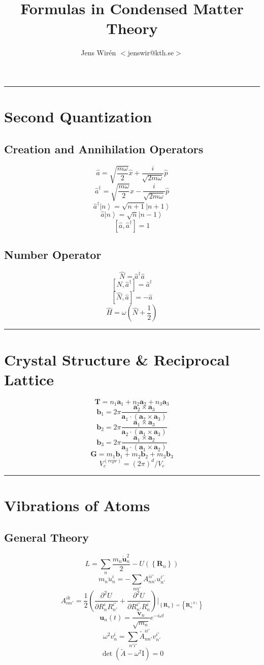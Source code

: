 \documentclass[12pt]{extarticle}
\title{Formulas in Condensed Matter Theory}
\author{Jens Wir\'{e}n $<$jenswir@kth.se$>$}
\newcommand{\parentheses}[1]{\ensuremath{\left( #1 \right)}}
\newcommand{\commutator}[1]{\ensuremath{\left[ #1 \right]}}
\newcommand{\anticommutator}[1]{\ensuremath{\left\lbrace #1 \right\rbrace}}
\newcommand{\ket}[1]{\left| #1 \right\rangle}
\newcommand{\creation}[1]{\hat{#1}^{\dagger}}
\newcommand{\mysection}[1]{
\vspace{1mm}
\hrule
\section{\Huge{#1}}}
\begin{document}
\begin{center}
\end{center}

\begin{multicols*}{2}
\setlength{\columnseprule}{0.3pt}

\mysection{Second Quantization}
\subsection{Creation and Annihilation Operators}
$$\hat{a}=\sqrt{\dfrac{m \omega}{2}} \hat{x} + \dfrac{i}{\sqrt{2m \omega}} \hat{p}$$
$$\creation{a}=\sqrt{\dfrac{m \omega}{2}} \hat{x} - \dfrac{i}{\sqrt{2m \omega}} \hat{p}$$
$$\creation{a} \ket{n} = \sqrt{n+1}\ket{n+1}$$
$$\hat{a} \ket{n} = \sqrt{n}\ket{n-1}$$
$$\commutator{\hat{a},\creation{a}} = 1$$

\subsection{Number Operator}
$$\hat{N}= \creation{a} \hat{a}	$$
$$\commutator{\hat{N},\creation{a}} = \creation{a}$$
$$\commutator{\hat{N},\hat{a}} = -\hat{a}$$
$$\hat{H}= \omega \parentheses{\hat{N}+\dfrac{1}{2}}$$

\mysection{Crystal Structure \& Reciprocal Lattice}
$$\mathbf{T}=n_1\mathbf{a}_1+n_2\mathbf{a}_2+n_3\mathbf{a}_3$$
$$\mathbf{b}_1=2\pi \dfrac{\mathbf{a}_2\times\mathbf{a}_3}{\mathbf{a}_1 \cdot \parentheses{\mathbf{a}_2\times\mathbf{a}_3}}$$
$$\mathbf{b}_2=2\pi \dfrac{\mathbf{a}_1\times\mathbf{a}_3}{\mathbf{a}_2 \cdot \parentheses{\mathbf{a}_1\times\mathbf{a}_3}}$$
$$\mathbf{b}_3=2\pi \dfrac{\mathbf{a}_1\times\mathbf{a}_2}{\mathbf{a}_3 \cdot \parentheses{\mathbf{a}_1\times\mathbf{a}_2}}$$
$$\mathbf{G}=m_1\mathbf{b}_1+m_2\mathbf{b}_2+m_3\mathbf{b}_3$$
$$V_c^{(rcpr)}=(2\pi)^{d}/V_c$$

\mysection{Vibrations of Atoms}
\subsection{General Theory}
$$L=\sum_n \dfrac{m_n \dot{\mathbf{u}}_n^2}{2}-U \parentheses{ \anticommutator{\mathbf{R}_n} }$$
$$m_n \ddot{u}_n^i= - \sum_{nn'} A^{ii'}_{nn'} u^{i'}_{n'}$$
$$A^{ik}_{nn'}=\dfrac{1}{2} \parentheses{\dfrac{\partial^2 U}{\partial R^i_n R^{i'}_{n'}} +\dfrac{\partial^2 U}{\partial R^{i'}_{n'} R^i_n }} \big|_{\anticommutator{\mathbf{R}_n}=\anticommutator{\mathbf{R}_n^{(0)}}}$$
$$\mathbf{u}_n(t)=\dfrac{\mathbf{v}_n}{\sqrt{m_n}}e^{-i \omega t}$$
$$\omega^2 v_n^i = \sum_{n'i'} \tilde{A}_{nn'}^{ii'} v^{i'}_{n'}$$
$$\det \parentheses{\tilde{A}-\omega^2 \mathrm{I}}=0$$


\end{multicols*}
\end{document}
